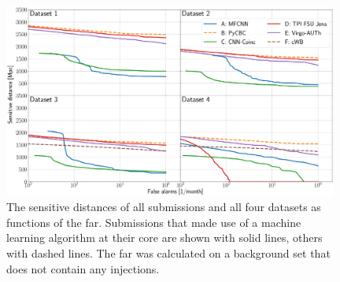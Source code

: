 \begin{figure}
    \centering
    \includegraphics[width=0.98\textwidth]{chapters/mdc/images/sens.pdf}
    \caption[Sensitive distances]{The sensitive distances of all submissions and all four datasets as functions of the \acrshort{far}. Submissions that made use of a machine learning algorithm at their core are shown with solid lines, others with dashed lines. The \acrshort{far} was calculated on a background set that does not contain any injections.}
    \label{fig:mlgwsc_sens}
\end{figure}

